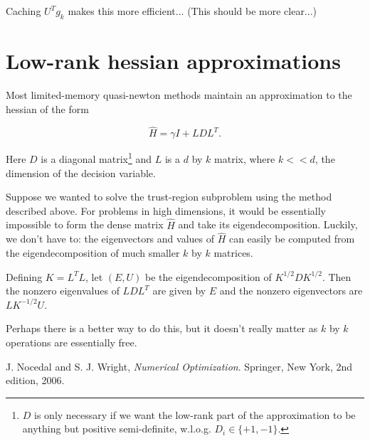 \documentclass[10pt]{article}
\begin{document}
Caching $U^Tg_k$ makes this more efficient...
(This should be more clear...)
\section{Low-rank hessian approximations}
Most limited-memory quasi-newton methods maintain an approximation to the hessian of the form 

$$ \hat{H} = \gamma I + LDL^{T}.$$

Here $D$ is a diagonal matrix\footnote{$D$ is only necessary if we want the low-rank part of the approximation to be anything but positive semi-definite, w.l.o.g. $D_i \in \{+1,-1\}$.} and $L$ is a $d$ by $k$ matrix, where $k << d$, the dimension of the decision variable.

Suppose we wanted to solve the trust-region subproblem using the method described above. For problems in high dimensions, it would be essentially impossible to form the dense matrix $\hat{H}$ and take its eigendecomposition. Luckily, we don't have to: the eigenvectors and values of $\hat{H}$ can easily be computed from the eigendecomposition of much smaller $k$ by $k$ matrices. 

Defining $K = L^TL$, let $(E,U)$ be the eigendecomposition of $K^{1/2}DK^{1/2}$. Then the nonzero eigenvalues of $LDL^T$ are given by $E$ and the nonzero eigenvectors are $LK^{-1/2}U$.

Perhaps there is a better way to do this, but it doesn't really matter as $k$ by $k$ operations are essentially free.


\begin{thebibliography}{9}

  J. Nocedal and S. J. Wright,
  \emph{Numerical Optimization}.
  Springer, New York,
  2nd edition,
  2006.

\end{thebibliography}
\end{document}
